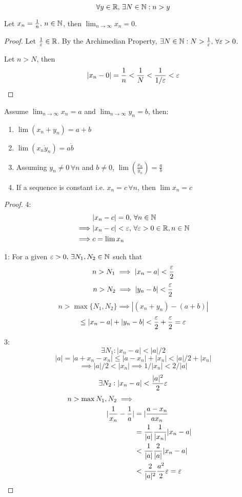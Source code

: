 \documentclass[a4paper,10pt]{article}
\begin{document}
 \begin{cor}
	 \[ \forall y \in \mathbb{R}, \, \exists N \in \mathbb{N} : n > y \]
 \end{cor}

 \begin{prop}
	 Let $x_n = \frac{1}{n}, \, n \in \mathbb{N}$, then $\lim_{n \to \infty}
	 x_n = 0$.
 \end{prop}

 \begin{proof}
	 Let $\frac{1}{\varepsilon} \in \mathbb{R}$. By the Archimedian Property,
	 $\exists N \in \mathbb{N} : N > \frac{1}{\varepsilon}, \, \forall \varepsilon > 0$.

	 Let $n>N$, then
	 \[ |x_n - 0| = \frac{1}{n} < \frac{1}{N} < \frac{1}{1/\varepsilon} < \varepsilon \]
 \end{proof}

 \begin{prop}
	 Assume $\lim_{n \to \infty} x_n = a$ and $\lim_{n \to \infty}
	 y_n = b$, then:
	 \begin{enumerate}
		 \item
			 $\lim (x_n + y_n) = a + b$
		 \item
			 $\lim (x_n \dot y_n) = a \dot b$
		 \item
			 Assuming $y_n \neq 0 \, \forall n$ and $b \neq 0$,
			 $\lim(\frac{x_n}{y_n}) = \frac{a}{b}$
		 \item
			 If a sequence is constant i.e. $x_n = c \,
			 \forall n$, then $\lim x_n = c$
	 \end{enumerate}
 \end{prop}

 \begin{proof}
	 4:
	 \begin{align*}
		 &|x_n - c| = 0, \, \forall n \in \mathbb{N} \\
		 \implies &|x_n - c| < \varepsilon, \, \forall \varepsilon > 0 \in \mathbb{R}, n \in \mathbb{N} \\
		 \implies &c = \lim x_n
	 \end{align*}

	 1:
	 For a given $\varepsilon > 0, \, \exists N_1, N_2 \in \mathbb{N}$ such that
	 \[ n > N_1 \implies |x_n - a| < \frac{\varepsilon}{2} \]
	 \[ n > N_2 \implies |y_n - b| < \frac{\varepsilon}{2} \]
	 \[
		 n > \max \{ N_1, N_2 \} \implies | (x_n + y_n) - (a+b)|
	 \]
	 \[
		 \leq |x_n - a| + |y_n - b|
		 < \frac{\varepsilon}{2} + \frac{\varepsilon}{2} = \varepsilon
	 \]

	 3:
	 \[ \exists N_1 : |x_n - a| < |a|/2 \]
	 \[ |a| = |a + x_n - x_n| \leq |a - x_n| + |x_n| < |a|/2 + |x_n| \]
	 \[ \implies |a|/2 < |x_n| \implies 1/|x_n| < 2/|a| \]
	 \[ \exists N_2 : |x_n -a| < \frac{|a|^2}{2}\varepsilon \]
	 \begin{align*}
		 n > \max{N_1, N_2} \implies \\
		 |\frac{1}{x_n} - \frac{1}{a}| &= |\frac{a-x_n}{ax_n} \\
		 &= \frac{1}{|a|}\frac{1}{|x_n|}|x_n - a| \\
		 &< \frac{1}{|a|}\frac{2}{|a|}|x_n - a| \\
		 &< \frac{2}{|a|^2}\frac{a^2}{2}\varepsilon = \varepsilon
	 \end{align*}

 \end{proof}
\end{document}
